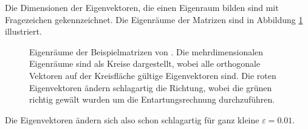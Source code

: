Die Dimensionen der Eigenvektoren, die einen Eigenraum bilden sind mit Fragezeichen gekennzeichnet.
Die Eigenräume der Matrizen sind in Abbildung \ref{ew:fig:entartung} illustriert.
\begin{figure}
    \begin{center}
        
    \end{center}
    \caption{
        Eigenräume der Beispielmatrizen von .
        Die mehrdimensionalen Eigenräume sind als Kreise dargestellt, wobei alle orthogonale Vektoren auf der Kreisfläche gültige Eigenvektoren sind.
        Die roten Eigenvektoren ändern schlagartig die Richtung, wobei die grünen richtig gewält wurden um die Entartungsrechnung durchzuführen. 
        }
    \label{ew:fig:entartung}
\end{figure}
Die Eigenvektoren ändern sich also schon schlagartig für ganz kleine $\varepsilon = 0.01$.


